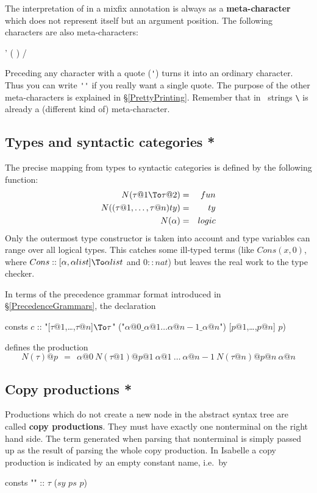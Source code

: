 The interpretation of \ttindex{_} in a mixfix annotation is always as a {\bf
  meta-character} which does not represent itself but
an argument position.  The following characters are also meta-characters:
\begin{ttbox}
'   (   )   /
\end{ttbox}
Preceding any character with a quote (\verb$'$) turns it into an ordinary
character.  Thus you can write \verb!''! if you really want a single quote.
The purpose of the other meta-characters is explained in
\S\ref{PrettyPrinting}.  Remember that in \ML\ strings \verb$\$ is already a
(different kind of) meta-character.


\subsection{Types and syntactic categories *}

The precise mapping from types to syntactic categories is defined by the
following function:
\begin{eqnarray*}
N(\tau@1\To\tau@2) &=& fun \\
N((\tau@1,\dots,\tau@n)ty) &=& ty \\
N(\alpha) &=& logic
\end{eqnarray*}
Only the outermost type constructor is taken into account and type variables
can range over all logical types.  This catches some ill-typed terms (like
$Cons(x,0)$, where $Cons :: [\alpha,\alpha list] \To \alpha list$ and $0 ::
nat$) but leaves the real work to the type checker.

In terms of the precedence grammar format introduced in
\S\ref{PrecedenceGrammars}, the declaration
\begin{ttbox}
consts \(c\) :: "[\(\tau@1\),\dots,\(\tau@n\)]\(\To\tau\)" ("\(\alpha@0\_\alpha@1\dots\alpha@{n-1}\_\alpha@n\)") [\(p@1\),\dots,\(p@n\)] \(p\))
\end{ttbox}
defines the production
\[ N(\tau)@p ~~=~~ \alpha@0 ~N(\tau@1)@{p@1}~ \alpha@1~ \dots
                  ~\alpha@{n-1} ~N(\tau@n)@{p@n}~ \alpha@n
\]

\subsection{Copy productions *}

Productions which do not create a new node in the abstract syntax tree are
called {\bf copy productions}.  They must have exactly one nonterminal on
the right hand side.  The term generated when parsing that nonterminal is
simply passed up as the result of parsing the whole copy production.  In
Isabelle a copy production is indicated by an empty constant name, i.e.\ by
\begin{ttbox}
consts "" :: \(\tau\)  (\(sy\) \(ps\) \(p\))
\end{ttbox}

